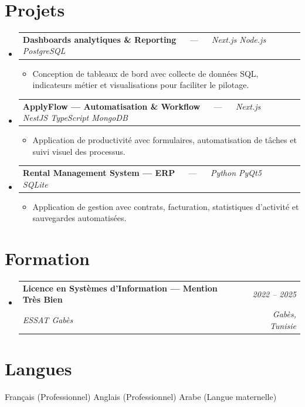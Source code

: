 \documentclass[letterpaper,9pt]{article}
\makeatletter
\newcommand{\resumeItem}[1]{\item\small{#1}}
\newcommand{\resumeSubheading}[4]{
  \vspace{-1pt}\item
  \begin{tabular*}{0.97\textwidth}[t]{l@{\extracolsep{\fill}}r}
    \textbf{#1} & \textit{\color{greytext}#2} \\
    \textit{\small\color{greytext} #3} & \textit{\small\color{greytext} #4}
  \end{tabular*}\vspace{-2pt}
}
\newcommand{\resumeProjectHeading}[2]{
  \item
  \begin{tabular*}{0.97\textwidth}{l@{\extracolsep{\fill}}r}
    \small #1 & #2
  \end{tabular*}\vspace{-1pt}
}
\newcommand{\resumeSubHeadingListStart}{\begin{itemize}[leftmargin=0.18in, label={}, itemsep=1.2pt, topsep=2.5pt, parsep=0pt]}
\newcommand{\resumeSubHeadingListEnd}{\end{itemize}\vspace{-2pt}}
\newcommand{\resumeProjectListStart}{\begin{itemize}[leftmargin=0.24in, label={}, itemsep=0.9pt, topsep=1.2pt, parsep=0pt]}
\newcommand{\resumeProjectListEnd}{\end{itemize}\vspace{-2pt}}
\makeatother
\begin{document}
\section{Projets}
\resumeSubHeadingListStart

  \resumeProjectHeading{\textbf{Dashboards analytiques \& Reporting} $\quad$ --- $\quad$ \emph{\color{greytext}Next.js \textperiodcentered{} Node.js \textperiodcentered{} PostgreSQL}}{}
    \resumeProjectListStart
      \resumeItem{Conception de tableaux de bord avec collecte de données SQL, indicateurs métier et visualisations pour faciliter le pilotage.}
    \resumeProjectListEnd

  \resumeProjectHeading{\textbf{ApplyFlow — Automatisation \& Workflow} $\quad$ --- $\quad$ \emph{\color{greytext}Next.js \textperiodcentered{} NestJS \textperiodcentered{} TypeScript \textperiodcentered{} MongoDB}}{}
    \resumeProjectListStart
      \resumeItem{Application de productivité avec formulaires, automatisation de tâches et suivi visuel des processus.}
    \resumeProjectListEnd

  \resumeProjectHeading{\textbf{Rental Management System — ERP} $\quad$ --- $\quad$ \emph{\color{greytext}Python \textperiodcentered{} PyQt5 \textperiodcentered{} SQLite}}{}
    \resumeProjectListStart
      \resumeItem{Application de gestion avec contrats, facturation, statistiques d'activité et sauvegardes automatisées.}
    \resumeProjectListEnd

\resumeSubHeadingListEnd\vspace{-3pt}

\section{Formation}
\resumeSubHeadingListStart
  \resumeSubheading{Licence en Systèmes d'Information — Mention Très Bien}{2022 -- 2025}{ESSAT Gabès}{Gabès, Tunisie}
\resumeSubHeadingListEnd\vspace{-1pt}

\section{Langues}
\begin{itemize}[leftmargin=0.18in, label={}, topsep=2pt, itemsep=1pt, parsep=0pt]
\footnotesize{
  \item Français (Professionnel) \textperiodcentered{} Anglais (Professionnel) \textperiodcentered{} Arabe (Langue maternelle)
}
\end{itemize}
\end{document}
